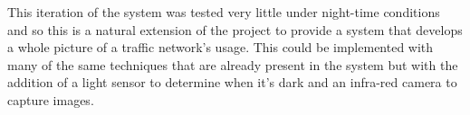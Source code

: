 This iteration of the system was tested very little under night-time conditions and so this is a natural extension of the project to provide a system that develops a whole picture of a traffic network's usage. This could be implemented with many of the same techniques that are already present in the system but with the addition of a light sensor to determine when it's dark and an infra-red camera to capture images. 